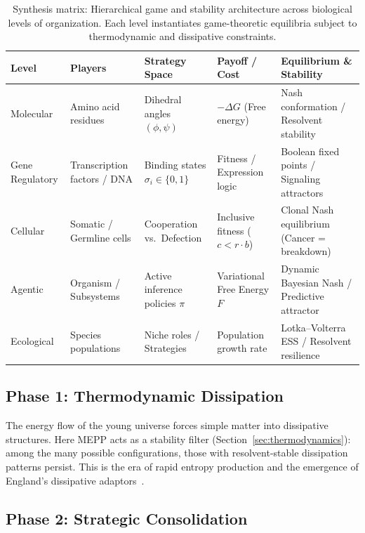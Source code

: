 \documentclass[12pt,a4paper]{article}
\theoremstyle{remark}
\begin{document}
\begin{table}[htbp]
\centering
\caption{Synthesis matrix: Hierarchical game and stability architecture across biological levels of organization. Each level instantiates game-theoretic equilibria subject to thermodynamic and dissipative constraints.}
\label{tab:biological-game-hierarchy}
\small
\begin{tabularx}{\textwidth}{@{}L{0.16\textwidth} L{0.18\textwidth} L{0.20\textwidth} L{0.22\textwidth} Y@{}}
\toprule
\textbf{Level} & \textbf{Players} & \textbf{Strategy Space} & \textbf{Payoff / Cost} & \textbf{Equilibrium \& Stability} \\
\midrule
Molecular & Amino acid residues & Dihedral angles $(\phi, \psi)$ & $-\Delta G$ (Free energy) & Nash conformation / Resolvent stability \\
Gene Regulatory & Transcription factors / DNA & Binding states $\sigma_i \in \{0,1\}$ & Fitness / Expression logic & Boolean fixed points / Signaling attractors \\
Cellular & Somatic / Germline cells & Cooperation vs.\ Defection & Inclusive fitness ($c < r \cdot b$) & Clonal Nash equilibrium (Cancer = breakdown) \\
Agentic & Organism / Subsystems & Active inference policies $\pi$ & Variational Free Energy $F$ & Dynamic Bayesian Nash / Predictive attractor \\
Ecological & Species populations & Niche roles / Strategies & Population growth rate & Lotka--Volterra ESS / Resolvent resilience \\
\bottomrule
\end{tabularx}
\end{table}


\subsection{Phase 1: Thermodynamic Dissipation}

The energy flow of the young universe forces simple matter into dissipative structures. Here MEPP acts as a stability filter (Section~\ref{sec:thermodynamics}): among the many possible configurations, those with resolvent-stable dissipation patterns persist. This is the era of rapid entropy production and the emergence of England's dissipative adaptors~\citep{EcosystemMEPP}.

\subsection{Phase 2: Strategic Consolidation}
\end{document}
